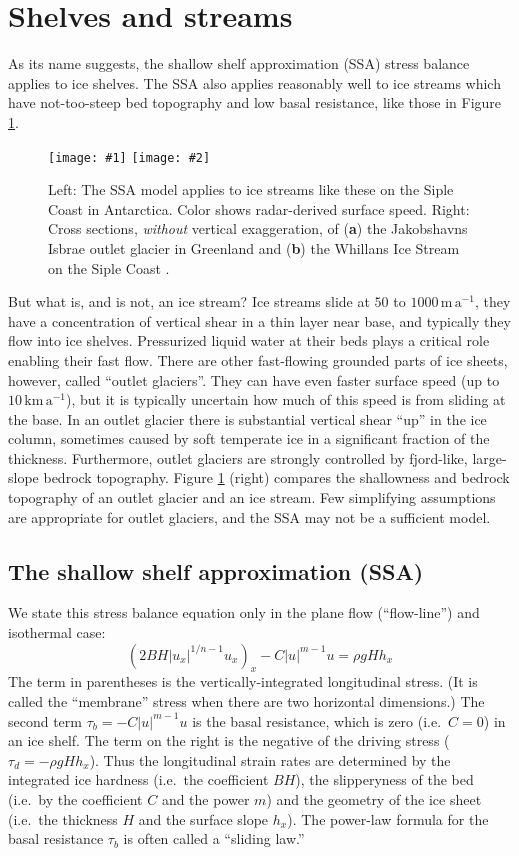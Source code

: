 \documentclass[letterpaper,final,12pt,reqno]{amsart}
\newcommand{\twofigsizes}[5]{
\begin{figure}[ht]
\centering
\texttt{[image: \#1]} \quad
\texttt{[image: \#2]}
\caption{#3}
\label{fig:#1}
\end{figure}}
\begin{document}
\section{Shelves and streams}  \label{sec:shelvesandstreams}

As its name suggests, the shallow shelf approximation (SSA) stress balance applies to ice shelves.  The SSA also applies reasonably well to ice streams which have not-too-steep bed topography and low basal resistance, like those in Figure \ref{fig:siple}.

\twofigsizes{siple}{streamisbrae}{Left:  The SSA model applies to ice streams like these on the Siple Coast in Antarctica.  Color shows radar-derived surface speed.  Right: Cross sections, \emph{without} vertical exaggeration, of (\textbf{a}) the Jakobshavns Isbrae outlet glacier in Greenland and (\textbf{b}) the Whillans Ice Stream on the Siple Coast \cite{TrufferEchelmeyer}.}{2.8in}{2.9in}

But what is, and is not, an ice stream?  Ice streams slide at $50$ to $1000 \,\text{m}\,\text{a}^{-1}$, they have a concentration of vertical shear in a thin layer near base, and typically they flow into ice shelves.  Pressurized liquid water at their beds plays a critical role enabling their fast flow.  There are other fast-flowing grounded parts of ice sheets, however, called ``outlet glaciers''.  They can have even faster surface speed (up to $10 \,\text{km}\,\text{a}^{-1}$), but it is typically uncertain how much of this speed is from sliding at the base.  In an outlet glacier there is substantial vertical shear ``up'' in the ice column, sometimes caused by soft temperate ice in a significant fraction of the thickness.  Furthermore, outlet glaciers are strongly controlled by fjord-like, large-slope bedrock topography.  Figure \ref{fig:siple} (right) compares the shallowness and bedrock topography of an outlet glacier and an ice stream.  Few simplifying assumptions are appropriate for outlet glaciers, and the SSA may not be a sufficient model.

\subsection*{The shallow shelf approximation (SSA)}  We state this stress balance equation only in the plane flow (``flow-line'') and isothermal case:
\begin{equation}
  \left(2 B H |u_x|^{1/n - 1} u_x\right)_x - C|u|^{m-1}u = \rho g H h_x \label{ssaearly}
\end{equation}
The term in parentheses is the vertically-integrated longitudinal stress.  (It is called the ``membrane'' stress when there are two horizontal dimensions.)  The second term $\tau_b = - C|u|^{m-1}u$ is the basal resistance, which is zero (i.e.~$C=0$) in an ice shelf.  The term on the right is the negative of the driving stress ($\tau_d = - \rho g H h_x$).  Thus the longitudinal strain rates are determined by the integrated ice hardness (i.e.~the coefficient $BH$), the slipperyness of the bed (i.e.~by the coefficient $C$ and the power $m$) and the geometry of the ice sheet (i.e.~the thickness $H$ and the surface slope $h_x$).  The power-law formula for the basal resistance $\tau_b$ is often called a ``sliding law.''
\end{document}
